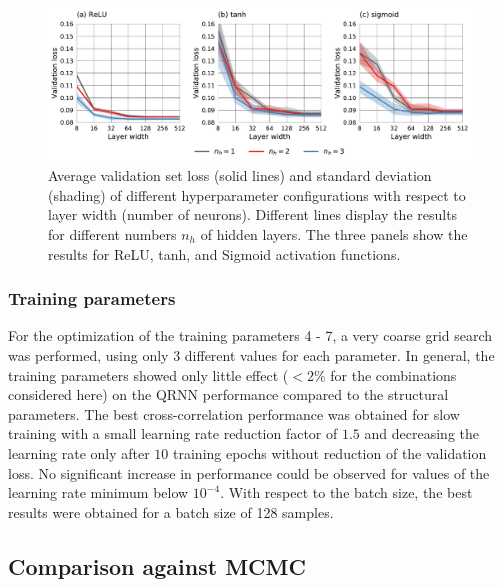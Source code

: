 \documentclass[journal abbreviation, manuscript]{copernicus}
\begin{document}
  \begin{figure}[hbpt!]
    \centering
    \includegraphics[width = 1.0\linewidth]{../plots/hyperparams}
    \caption{Average validation set loss (solid lines) and standard deviation (shading)
             of different hyperparameter configurations with respect to layer width (number of neurons).
             Different lines display the results for different numbers $n_h$ of hidden layers.
             The three panels show the results for ReLU, tanh, and Sigmoid activation functions.}
    \label{fig:hyperparams}
  \end{figure}

 \subsubsection{Training parameters}
 
For the optimization of the training parameters 4 - 7, a very coarse grid
search was performed, using only 3 different values for each parameter.
In general, the training parameters showed only little effect ($< 2\%$ for the
combinations considered here) on the QRNN performance compared to the structural
parameters. The best cross-correlation performance was obtained for slow
training with a small learning rate reduction factor of $1.5$ and decreasing the
learning rate only after $10$ training epochs without reduction of the
validation loss. No significant increase in performance could be observed for
values of the learning rate minimum below $10^{-4}$. With respect to the batch
size, the best results were obtained for a batch size of 128 samples.

\subsection{Comparison against MCMC}
  
\end{document}
